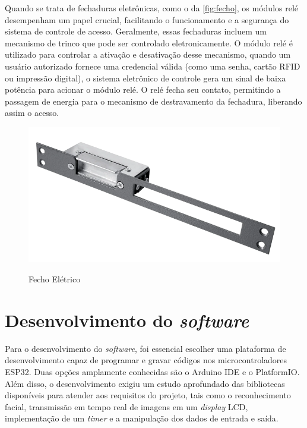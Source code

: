 Quando se trata de fechaduras eletrônicas, como o da \autoref{fig:fecho}, 
os módulos relé desempenham um papel crucial, facilitando o funcionamento e 
a segurança do sistema de controle de acesso. Geralmente, essas fechaduras 
incluem um mecanismo de trinco que pode ser controlado eletronicamente. 
O módulo relé é utilizado para controlar a ativação e desativação 
desse mecanismo, quando um usuário autorizado fornece uma credencial 
válida (como uma senha, cartão RFID ou impressão digital), o sistema 
eletrônico de controle gera um sinal de baixa potência para acionar 
o módulo relé. O relé fecha seu contato, permitindo a passagem de 
energia para o mecanismo de destravamento da fechadura, liberando 
assim o acesso.

\begin{figure}[h!]
    \centering
    \caption{Fecho Elétrico}
    \includegraphics[scale=0.25]{figuras/fechoagl.png}
    \label{fig:fecho}
    \centering
\end{figure}

\section{Desenvolvimento do \textit{software}}\label{sec:software}

Para o desenvolvimento do \textit{software}, foi essencial escolher uma plataforma 
de desenvolvimento capaz de programar e gravar códigos nos microcontroladores 
ESP32. Duas opções amplamente conhecidas são o Arduino IDE e o PlatformIO. 
Além disso, o desenvolvimento exigiu um estudo aprofundado das 
bibliotecas disponíveis para atender aos requisitos do projeto, 
tais como o reconhecimento facial, transmissão em tempo real de 
imagens em um \textit{display} LCD, implementação de um \textit{timer} e a manipulação 
dos dados de entrada e saída.

